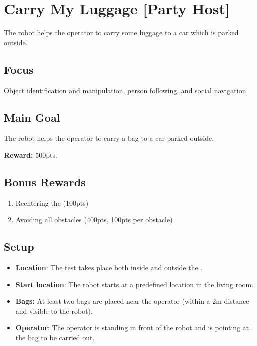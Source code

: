 \section{Carry My Luggage [Party Host]}
\label{test:carry-my-luggage}
The robot helps the operator to carry some luggage to a car which is parked outside.

\subsection*{Focus}
Object identification and manipulation, person following, and social navigation.

\subsection*{Main Goal}
The robot helps the operator to carry a bag to a car parked outside.

\noindent\textbf{Reward:} 500pts.

\subsection*{Bonus Rewards}
\begin{enumerate}[nosep]
	\item Reentering the \Arena{} (100pts)
	\item Avoiding all obstacles (400pts, 100pts per obstacle)
\end{enumerate}


\subsection*{Setup}
\begin{itemize}[nosep]
	\item \textbf{Location}: The test takes place both inside and outside the \Arena{}.
	\item \textbf{Start location}: The robot starts at a predefined location in the living room.
	\item \textbf{Bags:} At least two bags are placed near the operator (within a 2m distance and visible to the robot).
	\item \textbf{Operator}: The operator is standing in front of the robot and is pointing at the bag to be carried out.
\end{itemize}

